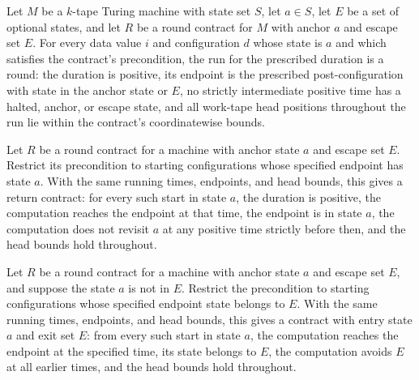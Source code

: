\begin{theorem}
\label{Turing.RoundContract.round}
\leanok
{}
Let $M$ be a $k$-tape Turing machine with state set $S$, let $a\in S$, let $E$ be a set
of optional states, and let $R$ be a round contract for $M$ with anchor $a$ and escape
set $E$. For every data value $i$ and configuration $d$ whose state is $a$ and which
satisfies the contract's precondition, the run for the prescribed duration is a round:
the duration is positive, its endpoint is the prescribed post-configuration with state
in the anchor state or $E$, no strictly intermediate positive time has a halted, anchor,
or escape state, and all work-tape head positions throughout the run lie within the
contract's coordinatewise bounds.
\end{theorem}

\begin{definition}
\label{Turing.RoundContract.returning}
\leanok
{}
Let $R$ be a round contract for a machine with anchor state $a$ and escape set $E$.
Restrict its precondition to starting configurations whose specified endpoint has state
$a$. With the same running times, endpoints, and head bounds, this gives a return
contract: for every such start in state $a$, the duration is positive, the computation
reaches the endpoint at that time, the endpoint is in state $a$, the computation does
not revisit $a$ at any positive time strictly before then, and the head bounds hold
throughout.
\end{definition}

\begin{definition}
\label{Turing.RoundContract.escaping}
\leanok
{}
Let $R$ be a round contract for a machine with anchor state $a$ and escape set $E$, and
suppose the state $a$ is not in $E$. Restrict the precondition to starting
configurations whose specified endpoint state belongs to $E$. With the same running
times, endpoints, and head bounds, this gives a contract with entry state $a$ and exit
set $E$: from every such start in state $a$, the computation reaches the endpoint at the
specified time, its state belongs to $E$, the computation avoids $E$ at all earlier
times, and the head bounds hold throughout.
\end{definition}

